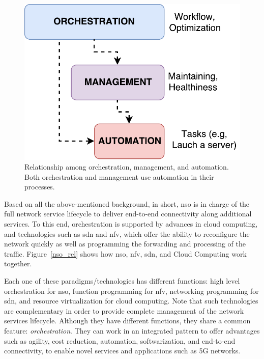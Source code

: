 \begin{figure}[t]
    \centering
    \includegraphics[scale=.45]{Figures/02_Background/OrchManaAut}
      \caption{Relationship among orchestration, management, and automation. Both orchestration and management use automation in their processes.}
      \label{diff}
\end{figure}

Based on all the above-mentioned background, in short, \gls{nso} is in charge of the full network service lifecycle to deliver end-to-end connectivity along additional services. To this end, orchestration is supported by advances in cloud computing, and technologies such as \gls{sdn} and \gls{nfv}, which offer the ability to reconfigure the network quickly as well as programming the forwarding and processing of the traffic. Figure~\ref{nso_rel} shows how \gls{nso}, \gls{nfv}, \gls{sdn}, and Cloud Computing work together. 

Each one of these paradigms/technologies has different functions: high level orchestration for \gls{nso}, function programming for \gls{nfv}, networking programming for \gls{sdn},  and resource virtualization for cloud computing. Note that such technologies are complementary in order to provide complete management of the network services lifecycle. Although they have different functions, they share a common feature: \textit{orchestration}. They can work in an integrated pattern to offer advantages such as agility, cost reduction, automation, softwarization, and end-to-end connectivity, to enable novel services and applications such as 5G networks.

